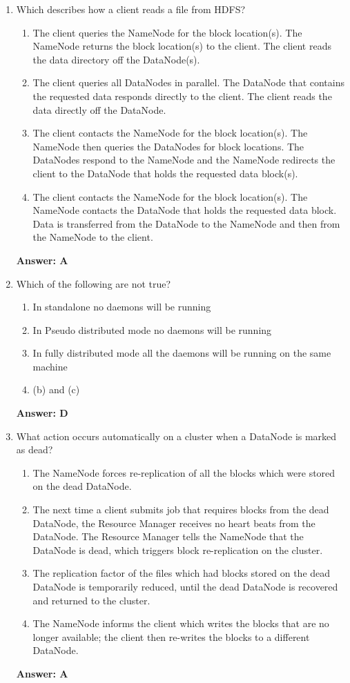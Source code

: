 \documentclass[12pt]{article}
\begin{document}
\begin{enumerate}
\item Which describes how a client reads a file from HDFS? 
\begin{enumerate} 
\item The client queries the NameNode for the block location(s). The NameNode returns the block location(s) to the client. The client reads the data directory off the DataNode(s). 
\item The client queries all DataNodes in parallel. The DataNode that contains the requested data responds directly to the client. The client reads the data directly off the DataNode.
\item The client contacts the NameNode for the block location(s). The NameNode then queries the DataNodes for block locations. The DataNodes respond to the NameNode and the NameNode redirects the client to the DataNode that holds the requested data block(s).
\item The client contacts the NameNode for the block location(s). The NameNode contacts the DataNode that holds the requested data block. Data is transferred from the DataNode to the NameNode and then from the NameNode to the client. 
\end{enumerate} \textbf{Answer: A}

\item Which of the following are not true? 
\begin{enumerate} 
\item In standalone no daemons will be running
\item In Pseudo distributed mode no daemons will be running
\item In fully distributed mode all the daemons will be running on the same machine
\item (b) and (c)
\end{enumerate} \textbf{Answer: D}

\item What action occurs automatically on a cluster when a DataNode is marked as dead? 
\begin{enumerate} 
\item The NameNode forces re-replication of all the blocks which were stored on the dead DataNode.
\item The next time a client submits job that requires blocks from the dead DataNode, the Resource Manager receives no heart beats from the DataNode. The Resource Manager tells the NameNode that the DataNode is dead, which triggers block re-replication on the cluster. 
\item The replication factor of the files which had blocks stored on the dead DataNode is temporarily reduced, until the dead DataNode is recovered and returned to the cluster.
\item The NameNode informs the client which writes the blocks that are no longer available; the client then re-writes the blocks to a different DataNode. 
\end{enumerate} \textbf{Answer: A} \newpage


\end{enumerate}
\end{document}
